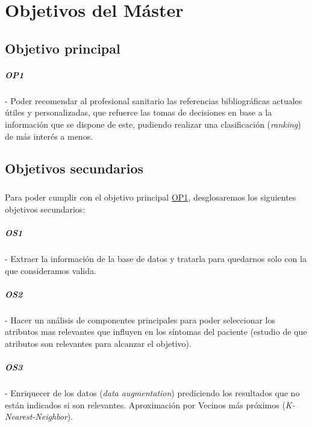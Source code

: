 \chapter{Objetivos del Máster}
\label{chapter:objetivos}


\section{Objetivo principal}

\label{op:OP1}
\paragraph{OP1} - Poder recomendar al profesional sanitario las referencias bibliográficas actuales útiles y personalizadas, que refuerce las tomas de decisiones en base a la información que se dispone de este, pudiendo realizar una clasificación (\textit{ranking}) de más interés a menos.

\section{Objetivos secundarios}

\paragraph{}
Para poder cumplir con el objetivo principal \hyperref[op:OP1]{OP1}, desglosaremos los siguientes objetivos secundarios:

\label{os:OS1}
\paragraph{OS1} - Extraer la información de la base de datos y tratarla para quedarnos solo con la que consideramos valida.

\label{os:OS2}
\paragraph{OS2} - Hacer un análisis de componentes principales para poder seleccionar los atributos mas relevantes que influyen en los síntomas del paciente (estudio de que atributos son relevantes para alcanzar el objetivo).

\label{os:OS3}
\paragraph{OS3} - Enriquecer de los datos (\textit{data augmentation}) prediciendo los resultados que no están indicados si son relevantes. Aproximación por Vecinos más próximos (\textit{K-Nearest-Neighbor}).

